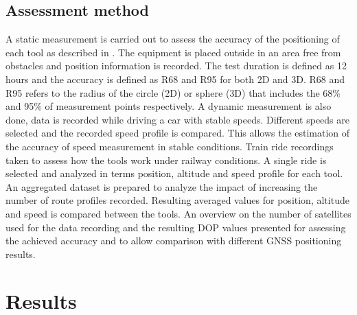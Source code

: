 \documentclass{article}
\begin{document}
		\subsection{Assessment method}
			A static measurement is carried out to assess the accuracy of the positioning of each tool as described in \cite{szotComparativeAnalysisPositioning2019}. The equipment is placed outside in an area free from obstacles and position information is recorded. The test duration is defined as 12 hours and the accuracy is defined as R68 and R95 for both 2D and 3D. R68 and R95 refers to the radius of the circle (2D) or sphere (3D) that includes the 68\% and 95\% of measurement points respectively. 
			A dynamic measurement is also done, data is recorded while driving a car with stable speeds. Different speeds are selected and the recorded speed profile is compared. This allows the estimation of the accuracy of speed measurement in stable conditions. 
			Train ride recordings taken to assess how the tools work under railway conditions. A single ride is selected and analyzed in terms position, altitude and speed profile for each tool. An aggregated dataset is prepared to analyze the impact of increasing the number of route profiles recorded. Resulting averaged values for position, altitude and speed is compared between the tools. 
			An overview on the number of satellites used for the data recording and the resulting DOP values presented for assessing the achieved accuracy and to allow comparison with different GNSS positioning results.
	\section{Results}
\end{document}
